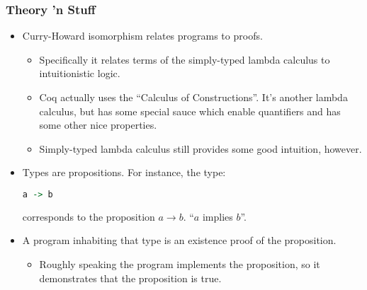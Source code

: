 \documentclass{beamer}
\begin{document}
\begin{frame}[fragile]
  \frametitle{Theory 'n Stuff}
  \begin{itemize}
  \item<1-> Curry-Howard isomorphism relates programs to proofs.
    \begin{itemize}
    \item Specifically it relates terms of the simply-typed lambda calculus to intuitionistic logic.
    \item Coq actually uses the ``Calculus of Constructions''. It's another lambda calculus, but has some special sauce which enable quantifiers and has some other nice properties.
    \item Simply-typed lambda calculus still provides some good intuition, however.
    \end{itemize}

  \item<2-> Types are propositions. For instance, the type:

\begin{lstlisting}[frame=single, language=Haskell, breaklines=true]
      a -> b
\end{lstlisting}

    corresponds to the proposition $a \rightarrow b$. ``$a$ implies $b$''.

  \item<3-> A program inhabiting that type is an existence proof of the proposition.

    \begin{itemize}
    \item Roughly speaking the program implements the proposition, so it demonstrates that the proposition is true.
    \end{itemize}
  \end{itemize}

\end{frame}
\end{document}
